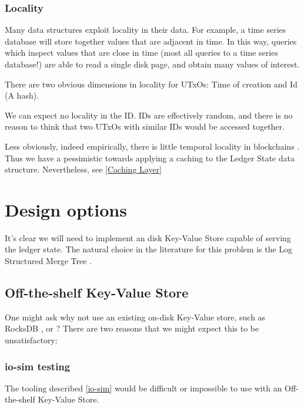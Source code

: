 \documentclass[11pt,a4paper]{article}
\begin{document}
\subsubsection{Locality}
\label{Locality}
Many data structures exploit locality in their data. For example, a time series database will store together values that are adjacent in time. In this way, queries which inspect values that are close in time (most all queries to a time series database!) are able to read a single disk page, and obtain many values of interest.

There are two obvious dimensions in locality for UTxOs: Time of creation and Id (A hash).

We can expect no locality in the ID. IDs are effectively random, and there is no reason to think that two UTxOs with similar IDs would be accessed together.

Less obviously, indeed empirically, there is little temporal locality in blockchains .
Thus we have a pessimistic towards applying a caching to the Ledger State data structure. Nevertheless, see \ref{Caching Layer}

\section{Design options}
\label{options}

It's clear we will need to implement an disk Key-Value Store capable of serving
the ledger state. The natural choice in the literature for this problem is the Log Structured Merge Tree . 

\subsection{Off-the-shelf Key-Value Store}


One might ask why not use an existing on-disk Key-Value store, such as
RocksDB , or ? There are two
reasons that we might expect this to be unsatisfactory:

\subsubsection{io-sim testing}
The tooling described \ref{io-sim} would be difficult or impossible to use with
an Off-the-shelf Key-Value Store.
\end{document}
